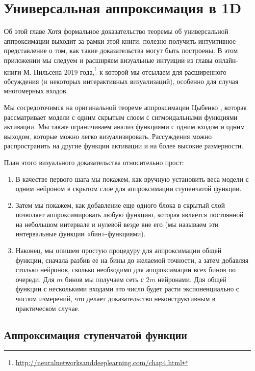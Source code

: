 \chapter{Универсальная аппроксимация в 1D}
\label{sec:universal_approximation}

\begin{supportbox}{Об этой главе}
Хотя формальное доказательство теоремы об универсальной аппроксимации выходит за рамки этой книги, полезно получить интуитивное представление о том, как такие доказательства могут быть построены. В этом приложении мы следуем и расширяем визуальные интуиции из главы онлайн-книги М. Нильсена 2019 года,\footnote{\url{http://neuralnetworksanddeeplearning.com/chap4.html}} к которой мы отсылаем для расширенного обсуждения (и некоторых интерактивных визуализаций), особенно для случая многомерных входов.
\end{supportbox}

Мы сосредоточимся на оригинальной теореме аппроксимации Цыбенко \cite{cybenko1989approximation}, которая рассматривает модели с одним скрытым слоем с сигмоидальными функциями активации. Мы также ограничиваем анализ функциями с одним входом и одним выходом, которые можно легко визуализировать. Рассуждения можно распространить на другие функции активации и на более высокие размерности.

План этого визуального доказательства относительно прост: 

\begin{enumerate}
\item В качестве первого шага мы покажем, как вручную установить веса модели с одним нейроном в скрытом слое для аппроксимации ступенчатой функции.
\item Затем мы покажем, как добавление еще одного блока в скрытый слой позволяет аппроксимировать любую функцию, которая является постоянной на небольшом интервале и нулевой везде вне его (мы называем эти интервальные функции «бин»-функциями). 
\item Наконец, мы опишем простую процедуру для аппроксимации общей функции, сначала разбив ее на бины до желаемой точности, а затем добавляя столько нейронов, сколько необходимо для аппроксимации всех бинов по очереди. Для $m$ бинов мы получаем сеть с $2m$ нейронами. Для общей функции с несколькими входами это число будет расти экспоненциально с числом измерений, что делает доказательство неконструктивным в практическом случае.
\end{enumerate}

\section{Аппроксимация ступенчатой функции}

